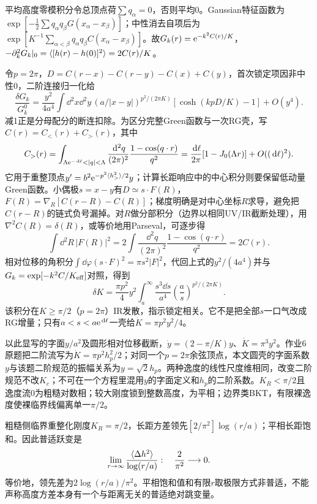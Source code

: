 \begin{solution}
平均高度零模积分令总顶点荷$\sum q_\alpha=0$，否则平均0。Gaussian特征函数为$\exp[-\tfrac12\sum q_\alpha q_\beta G(x_\alpha-x_\beta)]$；中性消去自项后为$\exp[K^{-1}\sum_{\alpha<\beta}q_\alpha q_\beta C(x_\alpha-x_\beta)]$。故$G_k(r)=\mathrm e^{-k^2C(r)/K}$，$-\partial_k^2G_k|_0=\langle [h(r)-h(0)]^2\rangle=2C(r)/K$。

令$p=2\pi$，$D=C(r-x)-C(r-y)-C(x)+C(y)$，首次锁定项因非中性0，二阶连接归一化给
\begin{equation}
\frac{\delta G_k}{G_k^0}=\frac{y^2}{4a^4}\int\dd^2x\dd^2y\,(a/|x-y|)^{p^2/(2\pi K)}[\cosh(kpD/K)-1]+O(y^4).
\end{equation}
减1正是分母配分的断连扣除。为区分完整Green函数与一次RG壳，写$C(r)=C_<(r)+C_>(r)$，其中
\begin{equation}
C_>(r)=\int_{\Lambda\e^{-\dd\ell}<|q|<\Lambda}\frac{\dd^2q}{(2\pi)^2}
\frac{1-\cos(q\cdot r)}{q^2}
=\frac{\dd\ell}{2\pi}[1-J_0(\Lambda r)]+O((\dd\ell)^2).
\end{equation}
它用于重整顶点$y'=b^2\mathrm e^{-p^2\langle h_>^2\rangle/2}y$；计算长距响应中的中心积分则要保留低动量Green函数。小偶极$s=x-y$有$D\simeq s\cdot F(R)$，$F(R)=\nabla_R[C(r-R)-C(R)]$；梯度明确是对中心坐标$R$求导，避免把$C(r-R)$的链式负号漏掉。对$R$做分部积分（边界以相同UV/IR截断处理），用$\nabla^2C(R)=\delta(R)$，或等价地用Parseval，可逐步得
\begin{equation}
\int\dd^2R\,|F(R)|^2
=2\int\frac{\dd^2q}{(2\pi)^2}\frac{1-\cos(q\cdot r)}{q^2}
=2C(r).
\end{equation}
相对位移的角积分$\int\dd\varphi(s\cdot F)^2=\pi s^2|F|^2$，代回上式的$y^2/(4a^4)$并与$G_k=\exp[-k^2C/K_{\rm eff}]$对照，得到
\begin{equation}
\delta K=\frac{\pi p^2}{4}y^2\int_a^\infty\frac{s^3\dd s}{a^4}
\left(\frac as\right)^{p^2/(2\pi K)}.
\end{equation}
该积分在$K\ge\pi/2$（$p=2\pi$）IR发散，指示锁定相关。它不是把全部$s$一口气改成RG增量；只有$a<s<a\mathrm e^{\,\mathrm d\ell}$一壳给$\dot K=\pi p^2y^2/4$。

以此显写的字面$y/a^2$及圆形相对位移截断，$\dot y=(2-\pi/K)y$、$\dot K=\pi^3y^2$。作业6原题把二阶流写为$\dot K=\pi p^2h_p^2/2$；对同一个$p=2\pi$余弦顶点，本文圆壳的字面系数$y$与该题二阶规范的振幅关系为$y=\sqrt2h_p$。两种逸度的线性尺度维相同，改变二阶规范不改$K_c$；不可在一个方程里混用$y$的字面定义和$h_p$的二阶系数。$K_R<\pi/2$且逸度流0为粗糙对数相；较大刚度锁到整数高度，为平相；边界类BKT，有限裸逸度使裸临界线偏离单一$\pi/2$。

粗糙侧临界重整化刚度$K_R=\pi/2$，长距方差领先$[2/\pi^2]\log(r/a)$；平相长距饱和。因此普适跃变是
\begin{equation}
\lim_{r\to\infty}\frac{\langle \Delta h^2\rangle}{\log(r/a)}:
\quad\frac{2}{\pi^2}\longrightarrow0.
\end{equation}
等价地，领先差为$2\log(r/a)/\pi^2$。平相饱和值和有限$r$取极限方式非普适，不能声称高度方差本身有一个与距离无关的普适绝对跳变量。
\end{solution}

